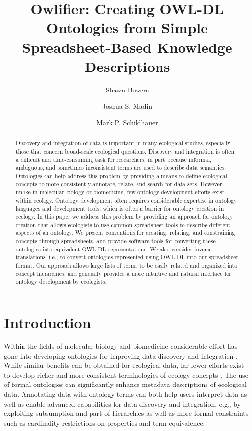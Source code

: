 \documentclass[preprint,number]{elsarticle}
\title{Owlifier: Creating OWL-DL Ontologies from Simple
  Spreadsheet-Based Knowledge Descriptions\tnoteref{t1}}
\author[smb]{Shawn Bowers\corref{cor1}}
\author[jsm]{Joshua S. Madin}
\author[mps]{Mark P. Schildhauer}
\begin{document}
\begin{abstract}
  Discovery and integration of data is important in many ecological
  studies, especially those that concern broad-scale ecological
  questions. Discovery and integration is often a difficult and
  time-consuming task for researchers, in part because informal,
  ambiguous, and sometimes inconsistent terms are used to describe
  data semantics.  Ontologies can help address this problem by
  providing a means to define ecological concepts to more consistently
  annotate, relate, and search for data sets.
  However, unlike in molecular biology or biomedicine, few ontology
  development efforts exist within ecology. Ontology development often
  requires considerable expertise in ontology languages and
  development tools, which is often a barrier for ontology creation in
  ecology. In this paper we address this problem by providing an
  approach for ontology creation that allows ecologists to use common
  spreadsheet tools to describe different aspects of an ontology.  We
  present conventions for creating, relating, and constraining
  concepts through spreadsheets, and provide software tools for
  converting these ontologies into equivalent OWL-DL
  representations. We also consider inverse translations, i.e., to
  convert ontologies represented using OWL-DL into our spreadsheet
  format. Our approach allows large lists of terms to be easily
  related and organized into concept hierarchies, and generally
   provides a more intuitive and natural interface for ontology
  development by ecologists.
\end{abstract}

\maketitle

\section{Introduction}

Within the fields of molecular biology and biomedicine considerable
effort has gone into developing ontologies for improving data
discovery and integration
\cite{bard04:_ontol_in_biolog,ashburner00:_gene_ontol}. While similar
benefits can be obtained for ecological data, far fewer efforts exist
to develop richer and more consistent terminologies of ecology
concepts
\cite{madin08:_advan_ecolog_resear_with_ontol,parr20:_data_sharin_in_ecolog_and_evolut}.
The use of formal ontologies can significantly enhance metadata
descriptions of ecological data. Annotating data with ontology terms
can both help users interpret data as well as enable advanced
capabilities for data discovery and integration, e.g., by exploiting
subsumption and part-of hierarchies as well as more formal constraints
such as cardinality restrictions on properties and term equivalence.
\end{document}
